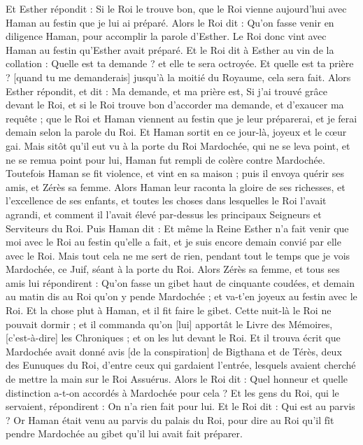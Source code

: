 \begin{multicols}{2}
Et Esther répondit : Si le Roi le trouve bon, que le Roi vienne aujourd'hui avec Haman au festin que je lui ai préparé.
Alors le Roi dit : Qu'on fasse venir en diligence Haman, pour accomplir la parole d'Esther. Le Roi donc vint avec Haman au festin qu'Esther avait préparé.
Et le Roi dit à Esther au vin de la collation : Quelle est ta demande ? et elle te sera octroyée. Et quelle est ta prière ? [quand tu me demanderais] jusqu'à la moitié du Royaume, cela sera fait.
Alors Esther répondit, et dit : Ma demande, et ma prière est,
Si j'ai trouvé grâce devant le Roi, et si le Roi trouve bon d'accorder ma demande, et d'exaucer ma requête ; que le Roi et Haman viennent au festin que je leur préparerai, et je ferai demain selon la parole du Roi.
Et Haman sortit en ce jour-là, joyeux et le cœur gai. Mais sitôt qu'il eut vu à la porte du Roi Mardochée, qui ne se leva point, et ne se remua point pour lui, Haman fut rempli de colère contre Mardochée.
Toutefois Haman se fit violence, et vint en sa maison ; puis il envoya quérir ses amis, et Zérès sa femme.
Alors Haman leur raconta la gloire de ses richesses, et l'excellence de ses enfants, et toutes les choses dans lesquelles le Roi l'avait agrandi, et comment il l'avait élevé par-dessus les principaux Seigneurs et Serviteurs du Roi.
Puis Haman dit : Et même la Reine Esther n'a fait venir que moi avec le Roi au festin qu'elle a fait, et je suis encore demain convié par elle avec le Roi.
Mais tout cela ne me sert de rien, pendant tout le temps que je vois Mardochée, ce Juif, séant à la porte du Roi.
Alors Zérès sa femme, et tous ses amis lui répondirent : Qu'on fasse un gibet haut de cinquante coudées, et demain au matin dis au Roi qu'on y pende Mardochée ; et va-t'en joyeux au festin avec le Roi. Et la chose plut à Haman, et il fit faire le gibet.
\VerseOne{}Cette nuit-là le Roi ne pouvait dormir ; et il commanda qu'on [lui] apportât le Livre des Mémoires, [c'est-à-dire] les Chroniques ; et on les lut devant le Roi.
Et il trouva écrit que Mardochée avait donné avis [de la conspiration] de Bigthana et de Térès, deux des Eunuques du Roi, d'entre ceux qui gardaient l'entrée, lesquels avaient cherché de mettre la main sur le Roi Assuérus.
Alors le Roi dit : Quel honneur et quelle distinction a-t-on accordés à Mardochée pour cela ? Et les gens du Roi, qui le servaient, répondirent : On n'a rien fait pour lui.
Et le Roi dit : Qui est au parvis ? Or Haman était venu au parvis du palais du Roi, pour dire au Roi qu'il fît pendre Mardochée au gibet qu'il lui avait fait préparer.

\end{multicols}
